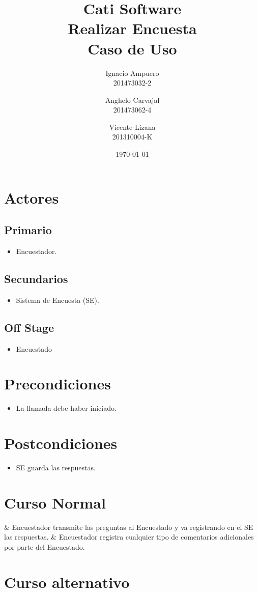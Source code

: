\documentclass[fleqn]{article}
\title{\huge Cati Software\\ \Huge Realizar Encuesta\\ \Large Caso de Uso \vspace{30pt}}
\author{Ignacio Ampuero\\ 201473032-2 \and Anghelo Carvajal\\ 201473062-4 \and Vicente Lizana\\ 201310004-K}
\date{\today}
\begin{document}
\maketitle
\vspace{30pt}

\section{Actores}

	\subsection{Primario}
	
	\begin{itemize}
		\item Encuestador.
	\end{itemize}
	
	\subsection{Secundarios}
	
	\begin{itemize}
		\item Sistema de Encuesta (SE).
	\end{itemize}
	
	\subsection{Off Stage}
	
	\begin{itemize}
		\item Encuestado
	\end{itemize}

\section{Precondiciones}

\begin{itemize}
	\item La llamada debe haber iniciado.
\end{itemize}

\section{Postcondiciones}

\begin{itemize}
	\item SE guarda las respuestas.
\end{itemize}

\section{Curso Normal}

\begin{easylist}
	& Encuestador transmite las preguntas al Encuestado y va registrando en el SE las respuestas.
	& Encuestador registra cualquier tipo de comentarios adicionales por parte del Encuestado.
\end{easylist}

\section{Curso alternativo}
\end{document}

